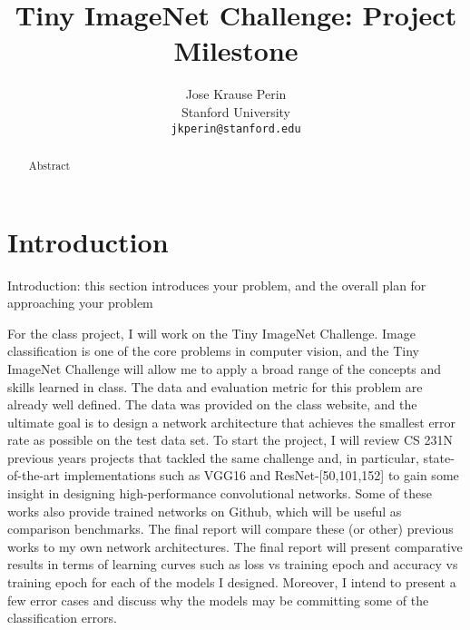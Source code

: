 \documentclass[10pt,twocolumn,letterpaper]{article}
\begin{document}
\title{Tiny ImageNet Challenge: Project Milestone}

\author{Jose Krause Perin\\
Stanford University\\
{\tt\small jkperin@stanford.edu}
}

\maketitle

\begin{abstract}
Abstract
\end{abstract}

\section{Introduction}
Introduction: this section introduces your problem, and the overall plan for approaching your problem


For the class project, I will work on the Tiny ImageNet Challenge. Image classification is one of the core problems in computer vision, and the Tiny ImageNet Challenge will allow me to apply a broad range of the concepts and skills learned in class. The data and evaluation metric for this problem are already well defined. The data was provided on the class website, and the ultimate goal is to design a network architecture that achieves the smallest error rate as possible on the test data set. To start the project, I will review CS 231N previous years projects that tackled the same challenge and, in particular, state-of-the-art implementations such as VGG16 and ResNet-[50,101,152] to gain some insight in designing high-performance convolutional networks. Some of these works also provide trained networks on Github, which will be useful as comparison benchmarks. The final report will compare these (or other) previous works to my own network architectures. The final report will present comparative results in terms of learning curves such as loss vs training epoch and accuracy vs training epoch for each of the models I designed. Moreover, I intend to present a few error cases and discuss why the models may be committing some of the classification errors. 
\end{document}

